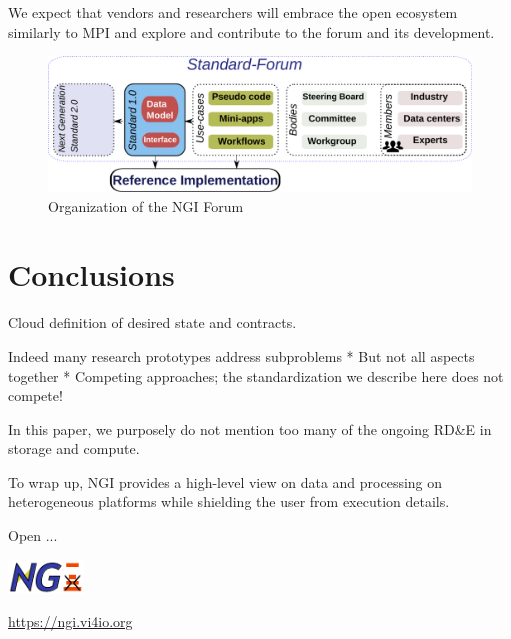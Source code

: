 \documentclass[a4paper, twocolumn]{article}
\begin{document}
We expect that vendors and researchers will embrace the open ecosystem similarly to MPI and explore and contribute to the forum and its development.

\begin{figure}[b]
  \includegraphics[width=\columnwidth]{standardization}
  \caption{Organization of the NGI Forum}
  \label{fig:standardization}
\end{figure}

\section{Conclusions}
\label{sec:conclusions}


Cloud definition of desired state and contracts.

Indeed many research prototypes address subproblems
* But not all aspects together
* Competing approaches; the standardization we describe here does not compete!

In this paper, we purposely do not mention too many of the ongoing RD\&E in storage and compute.




To wrap up, NGI provides a high-level view on data and processing on heterogeneous platforms while shielding the user from execution details.

Open ...

\includegraphics[width=2cm]{ngi-logo}

\noindent\url{https://ngi.vi4io.org}
\end{document}
